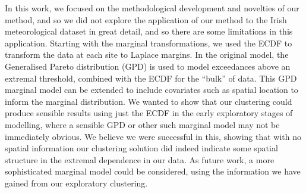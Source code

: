 \documentclass[
  12pt]{article}
\begin{document}
In this work, we focused on the methodological development and novelties of our method, and so we did not explore the application of our method to the Irish meteorological dataset in great detail, and so there are some limitations in this application.
Starting with the marginal transformations, we used the ECDF to transform the data at each site to Laplace margins.
In the original \citet{Heffernan2004} model, the Generalised Pareto distribution (GPD) is used to model exceedances above an extremal threshold, combined with the ECDF for the ``bulk'' of data. 
This GPD marginal model can be extended to include covariates such as spatial location to inform the marginal distribution.
We wanted to show that our clustering could produce sensible results using just the ECDF in the early exploratory stages of modelling, where a sensible GPD or other such marginal model may not be immediately obvious.
We believe we were successful in this, showing that with no spatial information our clustering solution did indeed indicate some spatial structure in the extremal dependence in our data.
As future work, a more sophisticated marginal model could be considered, using the information we have gained from our exploratory clustering. 
\end{document}

